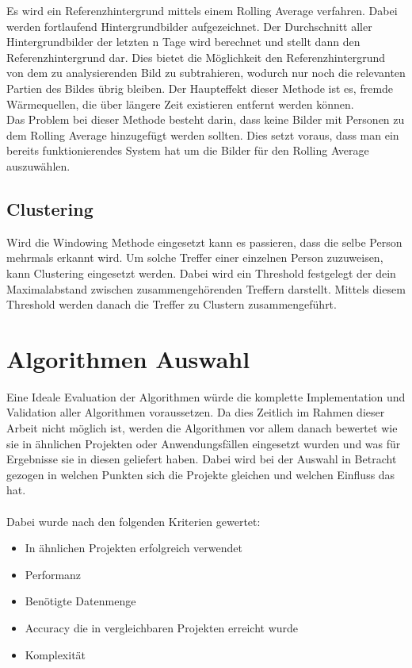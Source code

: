 Es wird ein Referenzhintergrund mittels einem Rolling Average verfahren. Dabei werden fortlaufend Hintergrundbilder aufgezeichnet. Der Durchschnitt aller Hintergrundbilder der letzten n Tage wird berechnet und stellt dann den Referenzhintergrund dar. Dies bietet die Möglichkeit den Referenzhintergrund von dem zu analysierenden Bild zu subtrahieren, wodurch nur noch die relevanten Partien des Bildes übrig bleiben. Der Haupteffekt dieser Methode ist es, fremde Wärmequellen, die über längere Zeit existieren entfernt werden können.\\
Das Problem bei dieser Methode besteht darin, dass keine Bilder mit Personen zu dem Rolling Average hinzugefügt werden sollten. Dies setzt voraus, dass man ein bereits funktionierendes System hat um die Bilder für den Rolling Average auszuwählen.

\subsection{Clustering}

Wird die Windowing Methode eingesetzt kann es passieren, dass die selbe Person mehrmals erkannt wird. Um solche Treffer einer einzelnen Person zuzuweisen, kann Clustering eingesetzt werden. Dabei wird ein Threshold festgelegt der dein Maximalabstand zwischen zusammengehörenden Treffern darstellt. Mittels diesem Threshold werden danach die Treffer zu Clustern zusammengeführt.

\section{Algorithmen Auswahl}

Eine Ideale Evaluation der Algorithmen würde die komplette Implementation und Validation aller Algorithmen voraussetzen. Da dies Zeitlich im Rahmen dieser Arbeit nicht möglich ist, werden die Algorithmen vor allem danach bewertet wie sie in ähnlichen Projekten oder Anwendungsfällen eingesetzt wurden und was für Ergebnisse sie in diesen geliefert haben. Dabei wird bei der Auswahl in Betracht gezogen in welchen Punkten sich die Projekte gleichen und welchen Einfluss das hat.\\
\\
Dabei wurde nach den folgenden Kriterien gewertet:
\begin{itemize}
	\item In ähnlichen Projekten erfolgreich verwendet
	\item Performanz
	\item Benötigte Datenmenge
	\item Accuracy die in vergleichbaren Projekten erreicht wurde
	\item Komplexität
\end{itemize}

